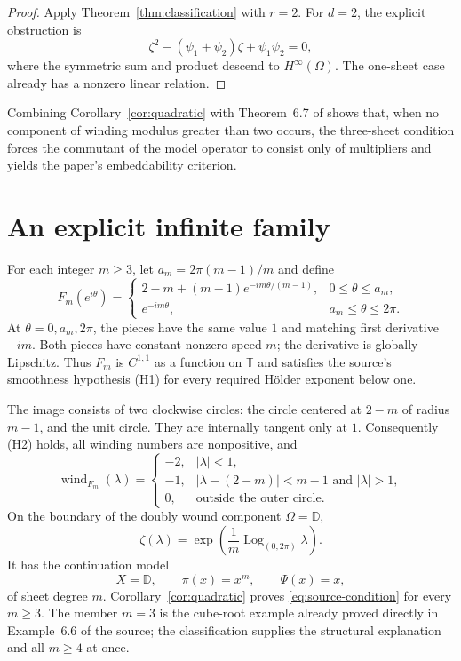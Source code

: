 \documentclass[11pt]{article}
\newcommand{\D}{\mathbb D}
\newcommand{\T}{\mathbb T}
\begin{document}
\begin{proof}
Apply Theorem~\ref{thm:classification} with $r=2$.  For $d=2$, the explicit
obstruction is
\[
 \zeta^2-(\psi_1+\psi_2)\zeta+\psi_1\psi_2=0,
\]
where the symmetric sum and product descend to $H^\infty(\Omega)$.  The
one-sheet case already has a nonzero linear relation.
\end{proof}

Combining Corollary~\ref{cor:quadratic} with Theorem~6.7 of
\cite{FGOYembedding} shows that, when no component of winding modulus greater
than two occurs, the three-sheet condition forces the commutant of the model
operator to consist only of multipliers and yields the paper's embeddability
criterion.

\section{An explicit infinite family}

For each integer $m\ge3$, let $a_m=2\pi(m-1)/m$ and define
\begin{equation}\label{eq:Fm}
 F_m(e^{i\theta})=
 \begin{cases}
 2-m+(m-1)e^{-im\theta/(m-1)},&0\le\theta\le a_m,\\
 e^{-im\theta},&a_m\le\theta\le2\pi.
 \end{cases}
\end{equation}
At $\theta=0,a_m,2\pi$, the pieces have the same value $1$ and matching
first derivative $-im$.  Both pieces have constant nonzero speed $m$; the
derivative is globally Lipschitz.  Thus $F_m$ is $C^{1,1}$ as a function on
$\T$ and satisfies the source's smoothness hypothesis (H1) for every required
H\"older exponent below one.

The image consists of two clockwise circles: the circle centered at $2-m$ of
radius $m-1$, and the unit circle.  They are internally tangent only at $1$.
Consequently (H2) holds, all winding numbers are nonpositive, and
\[
 \operatorname{wind}_{F_m}(\lambda)=
 \begin{cases}
 -2,&|\lambda|<1,\\
 -1,&|\lambda-(2-m)|<m-1\text{ and }|\lambda|>1,\\
 0,&\text{outside the outer circle}.
 \end{cases}
\]
On the boundary of the doubly wound component $\Omega=\D$,
\[
 \zeta(\lambda)=
 \exp\!\left(\frac1m\operatorname{Log}_{(0,2\pi)}\lambda\right).
\]
It has the continuation model
\[
 X=\D,\qquad \pi(x)=x^m,\qquad\Psi(x)=x,
\]
of sheet degree $m$.  Corollary~\ref{cor:quadratic} proves
\eqref{eq:source-condition} for every $m\ge3$.  The member $m=3$ is the
cube-root example already proved directly in Example~6.6 of the source; the
classification supplies the structural explanation and all $m\ge4$ at once.
\end{document}
